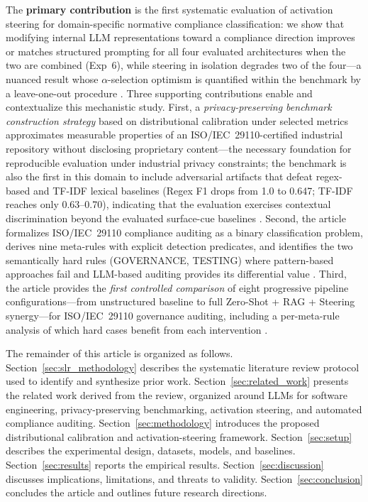 \documentclass{ieeeaccess}
\begin{document}
The \textbf{primary contribution} is the first systematic evaluation of activation steering for domain-specific normative compliance classification: we show that modifying internal LLM representations toward a compliance direction improves or matches structured prompting for all four evaluated architectures when the two are combined (Exp~6), while steering in isolation degrades two of the four---a nuanced result whose $\alpha$-selection optimism is quantified within the benchmark by a leave-one-out procedure \cite{zou2023representation,turner2023activation,li2023iti}. Three supporting contributions enable and contextualize this mechanistic study. First, a \emph{privacy-preserving benchmark construction strategy} based on distributional calibration under selected metrics approximates measurable properties of an ISO/IEC~29110-certified industrial repository without disclosing proprietary content---the necessary foundation for reproducible evaluation under industrial privacy constraints; the benchmark is also the first in this domain to include adversarial artifacts that defeat regex-based and TF-IDF lexical baselines (Regex F1 drops from 1.0 to 0.647; TF-IDF reaches only 0.63--0.70), indicating that the evaluation exercises contextual discrimination beyond the evaluated surface-cue baselines \cite{bauer2024syntheticdata,dwork2006differentialprivacy,mcmahan2017communication}. Second, the article formalizes ISO/IEC~29110 compliance auditing as a binary classification problem, derives nine meta-rules with explicit detection predicates, and identifies the two semantically hard rules (GOVERNANCE, TESTING) where pattern-based approaches fail and LLM-based auditing provides its differential value \cite{iso29110_2024,terronmacias,11276002,castellanos2022processcompliance}. Third, the article provides the \emph{first controlled comparison} of eight progressive pipeline configurations---from unstructured baseline to full Zero-Shot + RAG + Steering synergy---for ISO/IEC~29110 governance auditing, including a per-meta-rule analysis of which hard cases benefit from each intervention \cite{fuchss2025lissa,laporte2016vse,munoz2020implementations,101145}.

The remainder of this article is organized as follows. Section~\ref{sec:slr_methodology} describes the systematic literature review protocol used to identify and synthesize prior work. Section~\ref{sec:related_work} presents the related work derived from the review, organized around LLMs for software engineering, privacy-preserving benchmarking, activation steering, and automated compliance auditing. Section~\ref{sec:methodology} introduces the proposed distributional calibration and activation-steering framework. Section~\ref{sec:setup} describes the experimental design, datasets, models, and baselines. Section~\ref{sec:results} reports the empirical results. Section~\ref{sec:discussion} discusses implications, limitations, and threats to validity. Section~\ref{sec:conclusion} concludes the article and outlines future research directions.
\end{document}
